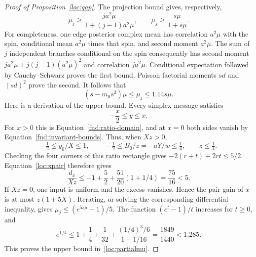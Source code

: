 \begin{proof}[Proof of Proposition~\ref{loc:gap}]
The projection bound gives, respectively,
\[
 \mu_j\ge\frac{j a^2\mu}{1+(j-1)a^2\mu},\qquad
 \mu_j\ge\frac{s\mu}{1+s\mu}.
\]
For completeness, one edge posterior complex mean has correlation
$a^2\mu$ with the spin, conditional mean $a^2\mu$ times that spin,
and second moment $a^2\mu$.  The sum of $j$ independent branches
conditional on the spin consequently has second moment
$ja^2\mu+j(j-1)(a^2\mu)^2$ and correlation $ja^2\mu$.
Conditional expectation followed by Cauchy--Schwarz proves the first
bound.  Poisson factorial moments $sd$ and $(sd)^2$ prove the second.
It follows that
\begin{equation}\label{loc:partialmu}
 (s-m_0s^2)\mu\le\mu_j\le1.14s\mu.
\end{equation}
Here is a derivation of the upper bound.  Every simplex message satisfies
\begin{equation}\label{loc:ratio}
 -\frac{x}{2}\le y\le x.
\end{equation}
For $x>0$ this is Equation~\eqref{fnd:ratio-domain}, and at
$x=0$ both sides vanish by Equation~\eqref{fnd:invariant-bounds}.
Thus, when $Xz>0$,
\[
 -\tfrac12\le y_0/X\le1,\qquad
 -\tfrac12\le B_0/z=-aY/w\le\tfrac14,\qquad z\le\tfrac14.
\]
Checking the four corners of this ratio rectangle gives
$-2(r+t)+2rt\le5/2$.  Equation~\eqref{loc:xpair} therefore gives
\[
 \frac{d_x}{Xz}\le-1+\frac52+\frac{51}{20}(1+1/4)
       =\frac{75}{16}<5.
\]
If $Xz=0$, one input is uniform and the excess vanishes.  Hence the
pair gain of $x$ is at most $z(1+5X)$.  Iterating, or solving the
corresponding differential inequality, gives
$\mu_j\le(e^{5s\mu}-1)/5$.
The function $(e^t-1)/t$ increases for $t\ge0$, and
\[
 e^{1/4}\le1+\frac14+\frac1{32}
       +\frac{(1/4)^3/6}{1-1/16}
       =\frac{1849}{1440}<1.285.
\]
This proves the upper bound in~\eqref{loc:partialmu}.


\end{proof}
